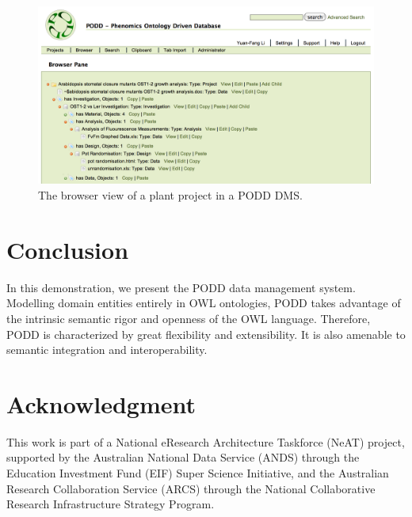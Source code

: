 \documentclass{llncs}
\begin{document}
\vspace{-8pt}
\begin{figure}[htb]
\centering
\includegraphics[trim = 5mm 0mm 5mm 0mm, clip,width=\textwidth]{browser.png}
\vspace{-8pt} \caption{The browser view of a plant project in a PODD
DMS.}\label{fig:browser}
\end{figure}

\section{Conclusion}\label{sec:concl}
In this demonstration, we present the PODD data management system. Modelling domain entities entirely in OWL ontologies, PODD takes advantage of the intrinsic semantic rigor and openness of the OWL language. Therefore, PODD is characterized by great flexibility and extensibility. It is also amenable to semantic integration and interoperability.

\section*{Acknowledgment}
This work is part of a National eResearch Architecture Taskforce (NeAT) project, supported by the Australian National Data Service (ANDS) through the Education Investment Fund (EIF) Super Science Initiative, and the Australian Research Collaboration Service (ARCS) through the National Collaborative Research Infrastructure Strategy Program. 



\end{document}
